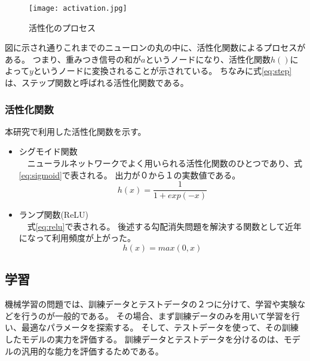 \documentclass[twocolumn,fleqn]{jsarticle}
\begin{document}
\begin{figure}[tb]
\centering
\texttt{[image: activation.jpg]}
\caption{活性化のプロセス}
\label{fig:act_process}
\end{figure}

図に示され通りこれまでのニューロンの丸の中に、活性化関数によるプロセスがある。
つまり、重みつき信号の和が$a$というノードになり、活性化関数$h()$によって$y$というノードに変換されることが示されている。
ちなみに式\ref{eq:step}は、ステップ関数と呼ばれる活性化関数である。

\subsubsection{活性化関数}
本研究で利用した活性化関数を示す。
\begin{itemize}
    \item シグモイド関数 \\
    　ニューラルネットワークでよく用いられる活性化関数のひとつであり、式\ref{eq:sigmoid}で表される。
    出力が０から１の実数値である。
    \begin{equation}
        h(x) = \frac{1}{1 + exp(-x)}
        \label{eq:sigmoid}
    \end{equation}

    \item ランプ関数(ReLU) \\
    　式\ref{eq:relu}で表される。
    後述する勾配消失問題を解決する関数として近年になって利用頻度が上がった。
    \begin{equation}
        h(x) = max(0, x)
        \label{eq:relu}
    \end{equation}
\end{itemize}

\subsection{学習}
機械学習の問題では、訓練データとテストデータの２つに分けて、学習や実験などを行うのが一般的である。
その場合、まず訓練データのみを用いて学習を行い、最適なパラメータを探索する。
そして、テストデータを使って、その訓練したモデルの実力を評価する。
訓練データとテストデータを分けるのは、モデルの汎用的な能力を評価するためである。
\end{document}
